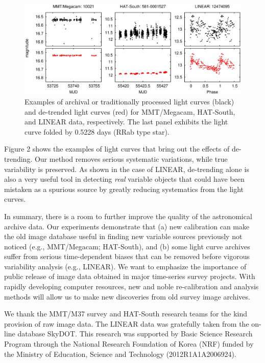 \begin{figure}[!t]
\begin{center}
\includegraphics[scale=0.42]{part2/Chang_O07/O07_f2.eps}
\caption{Examples of archival or traditionally processed light curves (black) and de-trended light curves (red) for MMT/Megacam, HAT-South, and LINEAR data, respectively.  The last panel exhibits the light curve folded by 0.5228 days (RRab type star).}
\end{center}
\label{Fig2}
\end{figure}

\noindent Figure 2 shows the examples of light curves that bring out the effects of de-trending.  Our method removes serious systematic variations, while true variability is preserved.  As shown in the case of LINEAR, de-trending alone is also a very useful tool in detecting {\itshape real} variable objects that could have been mistaken as a spurious source by greatly reducing systematics from the light curves.

In summary, there is a room to further improve the quality of the astronomical archive data.  Our experiments demonstrate that (a) new calibration can make the old image database useful in finding new variable sources previously not noticed (e.g., MMT/Megacam; HAT-South), and (b) some light curve archives suffer from serious time-dependent biases that can be removed before vigorous variability analysis (e.g., LINEAR).  We want to emphasize the importance of public release of image data obtained in major time-series survey projects.  With rapidly developing computer resources, new and noble re-calibration and analysis methods will allow us to make new discoveries from old survey image archives.  

\acknowledgements We thank the MMT/M37 survey and HAT-South research teams for the kind provision of raw image data.  The LINEAR data was gratefully taken from the on-line database SkyDOT.  This research was supported by Basic Science Research Program through the National Research Foundation of Korea (NRF) funded by the Ministry of Education, Science and Technology (2012R1A1A2006924).


